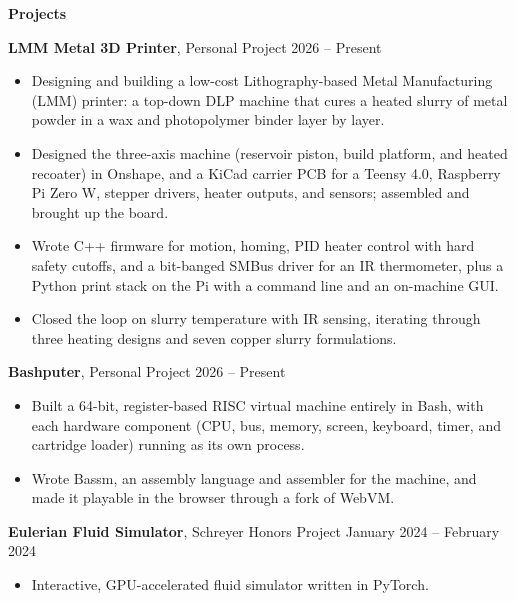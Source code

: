 \begin{center}
    \textbf{Projects}
\end{center}
\textbf{LMM Metal 3D Printer}, Personal Project \hfill 2026 -- Present
\begin{itemize}[noitemsep, topsep=0pt, partopsep=0pt, parsep=0pt]
    \item Designing and building a low-cost Lithography-based Metal Manufacturing (LMM) printer: a top-down DLP machine that cures a heated slurry of metal powder in a wax and photopolymer binder layer by layer.

    \item Designed the three-axis machine (reservoir piston, build platform, and heated recoater) in Onshape, and a KiCad carrier PCB for a Teensy 4.0, Raspberry Pi Zero W, stepper drivers, heater outputs, and sensors; assembled and brought up the board.

    \item Wrote C++ firmware for motion, homing, PID heater control with hard safety cutoffs, and a bit-banged SMBus driver for an IR thermometer, plus a Python print stack on the Pi with a command line and an on-machine GUI.

    \item Closed the loop on slurry temperature with IR sensing, iterating through three heating designs and seven copper slurry formulations.
\end{itemize}

\vspace{12pt}

\textbf{Bashputer}, Personal Project \hfill 2026 -- Present
\begin{itemize}[noitemsep, topsep=0pt, partopsep=0pt, parsep=0pt]
    \item Built a 64-bit, register-based RISC virtual machine entirely in Bash, with each hardware component (CPU, bus, memory, screen, keyboard, timer, and cartridge loader) running as its own process.

    \item Wrote Bassm, an assembly language and assembler for the machine, and made it playable in the browser through a fork of WebVM.
\end{itemize}

\vspace{12pt}

\textbf{Eulerian Fluid Simulator}, Schreyer Honors Project \hfill January 2024 -- February 2024
\begin{itemize}[noitemsep, topsep=0pt, partopsep=0pt, parsep=0pt]
    \item Interactive, GPU-accelerated fluid simulator written in PyTorch.
\end{itemize}
